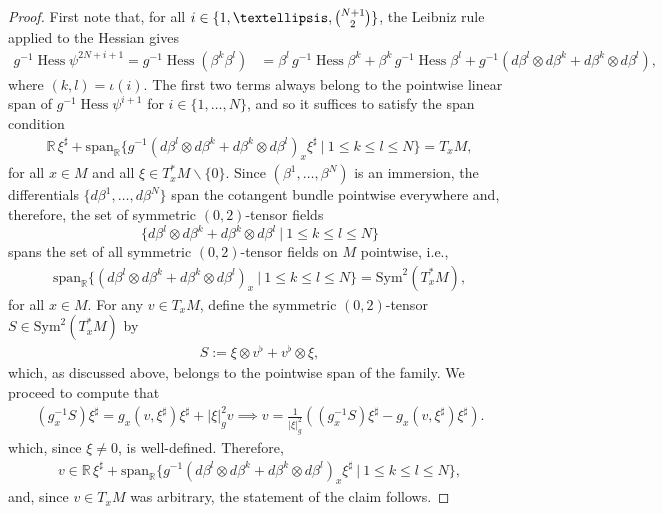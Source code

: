 \documentclass[10pt,a4paper]{amsart}
\DeclareMathOperator{\Hess}{Hess}
\newcommand{\M}{M}
\begin{document}
\begin{proof}
    First note that, for all $i\in\{1,\dots,\tbinom{N+1}{2}\}$, the Leibniz rule applied to the Hessian gives
%
\begin{align*}
    g^{-1}\Hess \psi^{2N+i+1} = g^{-1}\Hess (\beta^k\beta^l) &= \beta^l\, g^{-1}\Hess \beta^k + \beta^k\, g^{-1}\Hess \beta^l + g^{-1}(d\beta^l\otimes d\beta^k + d\beta^k\otimes d\beta^l),
\end{align*}
%
where $(k,l)=\iota(i)$. The first two terms always belong to the pointwise linear span of $g^{-1}\Hess\psi^{i+1}$ for $i\in\{1,\dots,N\}$, and so it suffices to satisfy the span condition
%
\begin{align*}
    \mathbb{R}\,\xi^\sharp +  \mathrm{span}_{\mathbb{R}}\{g^{-1}(d\beta^l\otimes d\beta^k + d\beta^k\otimes d\beta^l)_x\xi^\sharp~|~1\leq k\leq l \leq N\} = T_x\M,
\end{align*}
%
for all $x\in\M$ and all $\xi\in T_x^*\M\backslash\{0\}.$ Since $(\beta^1,\dots,\beta^N)$ is an immersion, the differentials $\{d\beta^1,\dots,d\beta^N\}$ span the cotangent bundle pointwise everywhere and, therefore, the set of symmetric $(0,2)$-tensor fields 
$$
\{d\beta^l\otimes d\beta^k + d\beta^k\otimes d\beta^l ~|~1\leq k\leq l \leq N\}
$$
%
spans the set of all symmetric $(0,2)$-tensor fields on $\M$ pointwise, i.e., 
%
\begin{align*}
    \mathrm{span}_{\mathbb{R}}\{(d\beta^l\otimes d\beta^k + d\beta^k\otimes d\beta^l)_x~|~1\leq k\leq l \leq N\} = \mathrm{Sym}^2(T_x^*\M),
\end{align*}
%
for all $x\in \M$. For any $v\in T_x\M$, define the symmetric $(0,2)$-tensor $S\in\mathrm{Sym}^2(T_x^*\M)$ by
%
\begin{align*}
    S:= \xi\otimes v^\flat +v^\flat\otimes\xi,
\end{align*}
%
which, as discussed above, belongs to the pointwise span of the family. We proceed to compute that
%
\begin{align*}
    (g_x^{-1}S)\xi^\sharp = g_x(v,\xi^\sharp)\xi^\sharp+|\xi|_g^2v \implies v =  \frac{1}{|\xi|_g^2}((g_x^{-1}S)\xi^\sharp - g_x(v,\xi^\sharp)\xi^\sharp).
\end{align*}
%
which, since $\xi\neq 0$, is well-defined. Therefore, 
%
\begin{align*}
    v\in \mathbb{R}\,\xi^\sharp +  \mathrm{span}_{\mathbb{R}}\{g^{-1}(d\beta^l\otimes d\beta^k + d\beta^k\otimes d\beta^l)_x\xi^\sharp~|~1\leq k\leq l \leq N\},
\end{align*}
%
and, since $v\in T_x\M$ was arbitrary, the statement of the claim follows.
\end{proof} 
\end{document}
